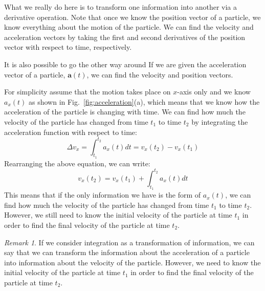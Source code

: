\documentclass[../main.tex]{subfiles}
\theoremstyle{remark}
\newtheorem*{remark}{Remark}
\begin{document}
What we really do here is to transform one information into another via a derivative operation. Note that once we know the position vector of a particle, we know everything about the motion of the particle. We can find the velocity and acceleration vectors by taking the first and second derivatives of the position vector with respect to time, respectively.

It is also possible to go the other way around If we are given the acceleration vector of a particle, $\mathbf{a}(t)$, we can find the velocity and position vectors.

For simplicity assume that the motion takes place on $x$-axis only and we know $a_x(t)$ as shown in Fig.~\ref{fig:acceleration}(a), which means that we know how the acceleration of the particle is changing with time. We can find how much the velocity of the particle has changed from time $t_1$ to time $t_2$ by integrating the acceleration function with respect to time:
\begin{equation}
    \Delta v_x = \int_{t_1}^{t_2} a_x(t) dt = v_x(t_2) - v_x(t_1)
\end{equation}
Rearranging the above equation, we can write:
\begin{equation}
    v_x(t_2) = v_x(t_1) + \int_{t_1}^{t_2} a_x(t) dt
\end{equation}
This means that if the only information we have is the form of $a_x(t)$, we can find how much the velocity of the particle has changed from time $t_1$ to time $t_2$. However, we still need to know the initial velocity of the particle at time $t_1$ in order to find the final velocity of the particle at time $t_2$. 

\begin{remark}
If we consider integration as a transformation of information, we can say that we can transform the information about the acceleration of a particle into information about the velocity of the particle. However, we need to know the initial velocity of the particle at time $t_1$ in order to find the final velocity of the particle at time $t_2$. 
\end{remark}
\end{document}
